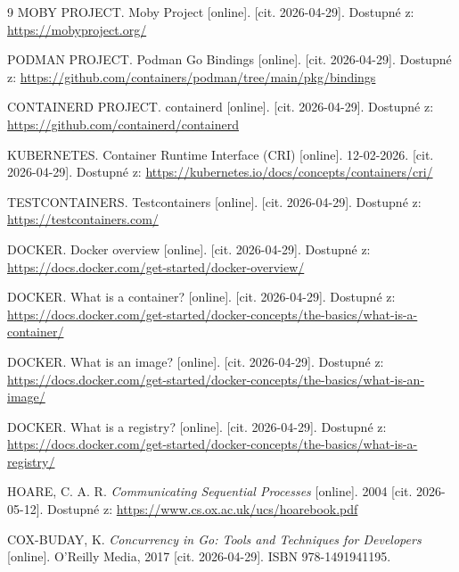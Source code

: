 \documentclass[
 program=infpvs,
  language=slovak,
  figures=false,
  tables=false,
  sourcecodes,
  glossaries,
  index
]{kidiplom}
\begin{document}
{%

\begin{thebibliography}{9}
 \uppercase{Moby Project}. Moby Project [online]. [cit. 2026-04-29]. Dostupné z: \url{https://mobyproject.org/}

 \uppercase{Podman Project}. Podman Go Bindings [online]. [cit. 2026-04-29]. Dostupné z: \url{https://github.com/containers/podman/tree/main/pkg/bindings}

 \uppercase{Containerd Project}. containerd [online]. [cit. 2026-04-29]. Dostupné z: \url{https://github.com/containerd/containerd}

 \uppercase{Kubernetes}. Container Runtime Interface (CRI) [online]. 12-02-2026. [cit. 2026-04-29]. Dostupné z: \url{https://kubernetes.io/docs/concepts/containers/cri/}

 \uppercase{Testcontainers}. Testcontainers [online]. [cit. 2026-04-29]. Dostupné z: \url{https://testcontainers.com/}

 \uppercase{Docker}. Docker overview [online]. [cit. 2026-04-29]. Dostupné z: \url{https://docs.docker.com/get-started/docker-overview/}

 \uppercase{Docker}. What is a container? [online]. [cit. 2026-04-29]. Dostupné z: \url{https://docs.docker.com/get-started/docker-concepts/the-basics/what-is-a-container/}

 \uppercase{Docker}. What is an image? [online]. [cit. 2026-04-29]. Dostupné z: \url{https://docs.docker.com/get-started/docker-concepts/the-basics/what-is-an-image/}

 \uppercase{Docker}. What is a registry? [online]. [cit. 2026-04-29]. Dostupné z: \url{https://docs.docker.com/get-started/docker-concepts/the-basics/what-is-a-registry/}

 \uppercase{Hoare, C. A. R.} \textit{Communicating Sequential Processes} [online]. 2004 [cit. 2026-05-12]. Dostupné z: \url{https://www.cs.ox.ac.uk/ucs/hoarebook.pdf}

 \uppercase{Cox-Buday, K.} \textit{Concurrency in Go: Tools and Techniques for Developers} [online]. O'Reilly Media, 2017 [cit. 2026-04-29]. ISBN 978-1491941195.


\end{thebibliography}}
\end{document}
